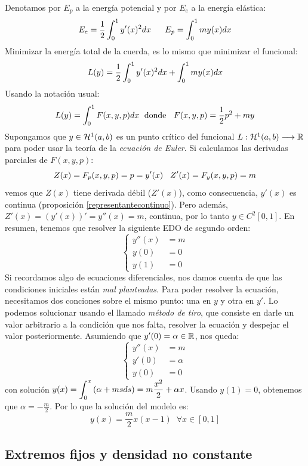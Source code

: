Denotamos por $E_p$ a la energía potencial y por $E_e$ a la energía elástica:
\[
E_e=\frac{1}{2}\displaystyle\int_{ 0 }^{ 1 } y'(x)^2dx \;\;\;\;\;\; E_p=\displaystyle\int_{ 0 }^{ 1 } my(x)dx
\]
Minimizar la energía total de la cuerda, es lo mismo que minimizar el funcional:
\[
L(y)=\frac{1}{2}\displaystyle\int_{ 0 }^{ 1 } y'(x)^2dx+\displaystyle\int_{ 0 }^{ 1 } my(x)dx
\]
Usando la notación usual:
\[
L(y)=\displaystyle\int_{ 0 }^{ 1 } F(x,y,p)dx \; \text{ donde } \;\; F(x,y,p)=\frac{1}{2}p^2+my
\]
Supongamos que $y\in\mathcal{H}^{ 1 } (a,b)$ es un punto crítico del funcional $L:\mathcal{H}^{ 1 } (a,b)\longrightarrow\mathbb{R}$ para poder usar la teoría de la \textit{ecuación de Euler}.
Si calculamos las derivadas parciales de $F(x,y,p)$:
\[
Z(x)=F_p(x,y,p)=p=y'(x) \;\;\; Z'(x)=F_y(x,y,p)=m
\]
vemos que $Z(x)$ tiene derivada débil ($Z'(x)$), como consecuencia, $y'(x)$ es continua (proposición \ref{representantecontinuo}). Pero además, $Z'(x)=(y'(x))'=y''(x)=m$, continua, por lo tanto $y\in C^2[0,1]$. En resumen, tenemos que resolver la siguiente EDO de segundo orden:
\[
\left\{
\begin{array}{rl}
y''(x) & = m \\
y(0) & = 0 \\
y(1) & = 0
\end{array}
\right.
\]
Si recordamos algo de ecuaciones diferenciales, nos damos cuenta de que las condiciones iniciales están \textit{mal planteadas}. Para poder resolver la ecuación, necesitamos dos conciones sobre el mismo punto: una en $y$ y otra en $y'$. Lo podemos solucionar usando el llamado \textit{método de tiro}, que consiste en darle un valor arbitrario a la condición que nos falta, resolver la ecuación y despejar el valor posteriormente. Asumiendo que $y'(0)=\alpha\in\mathbb{R}$, nos queda:
\[
\left\{
\begin{array}{rl}
y''(x) & = m \\
y'(0) & = \alpha \\
y(0) & = 0
\end{array}
\right.
\]
con solución $y(x)=\displaystyle\int_{ 0 }^{ x } \left(\alpha+msds\right)=m\frac{x^2}{2}+\alpha x$. Usando $y(1)=0$, obtenemos que $\alpha=-\frac{m}{2}$. Por lo que la solución del modelo es:
\[
y(x)=\frac{m}{2}x(x-1) \;\; \forall x \in[0,1]
\] 

\subsection{Extremos fijos y densidad no constante}

